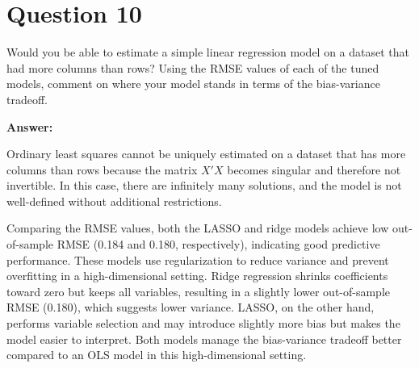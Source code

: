 \documentclass{article}
\begin{document}
\section*{Question 10}

Would you be able to estimate a simple linear regression model on a dataset that had more columns than rows? Using the RMSE values of each of the tuned models, comment on where your model stands in terms of the bias-variance tradeoff.

\textbf{Answer:}

Ordinary least squares cannot be uniquely estimated on a dataset that has more columns than rows because the matrix $X'X$ becomes singular and therefore not invertible. In this case, there are infinitely many solutions, and the model is not well-defined without additional restrictions.

Comparing the RMSE values, both the LASSO and ridge models achieve low out-of-sample RMSE (0.184 and 0.180, respectively), indicating good predictive performance. These models use regularization to reduce variance and prevent overfitting in a high-dimensional setting. Ridge regression shrinks coefficients toward zero but keeps all variables, resulting in a slightly lower out-of-sample RMSE (0.180), which suggests lower variance. LASSO, on the other hand, performs variable selection and may introduce slightly more bias but makes the model easier to interpret. Both models manage the bias-variance tradeoff better compared to an OLS model in this high-dimensional setting.
\end{document}
